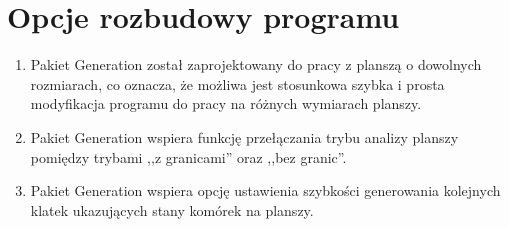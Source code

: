 \documentclass[a4paper,11pt]{article}
\begin{document}
\section{Opcje rozbudowy programu}
\begin{enumerate}

\item Pakiet Generation został zaprojektowany do pracy z planszą o dowolnych rozmiarach, co oznacza, że możliwa jest stosunkowa szybka i prosta modyfikacja programu do pracy na różnych wymiarach planszy.

\item Pakiet Generation wspiera funkcję przełączania trybu analizy planszy pomiędzy trybami ,,z granicami'' oraz ,,bez granic''.

\item Pakiet Generation wspiera opcję ustawienia szybkości generowania kolejnych klatek ukazujących stany komórek na planszy.

\end{enumerate}
\end{document}
